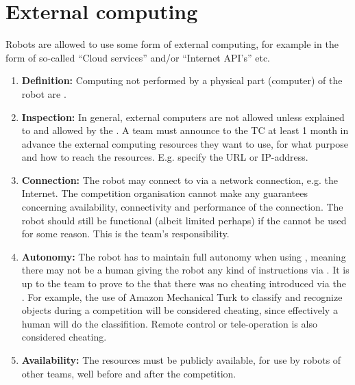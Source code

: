 \section{External computing}\label{rule:robot_external_computing}
Robots are allowed to use some form of external computing, for example in the form of so-called ``Cloud services'' and/or ``Internet API's'' etc. 
\begin{enumerate}
	\item \textbf{Definition:} Computing not performed by a physical part (computer) of the robot are . 
	\item \textbf{Inspection:} In general, external computers are not allowed unless explained to and allowed by the .
	  A team must announce to the TC at least 1 month in advance the external computing resources they want to use, for what purpose and how to reach the resources.
	  E.g. specify the URL or IP-address. 
	\item \textbf{Connection:} The robot may connect to  via a network connection, e.g. the Internet. 
	  The competition organisation cannot make any guarantees concerning availability, connectivity and performance of the connection. 
	  The robot should still be functional (albeit limited perhaps) if the  cannot be used for some reason.
	  This is the team's responsibility. 
	\item \textbf{Autonomy:} The robot has to maintain full autonomy when using , 
	  meaning there may not be a human giving the robot any kind of instructions via .
	  It is up to the team to prove to the  that there was no cheating introduced via the . 
	  For example, the use of Amazon Mechanical Turk to classify and recognize objects during a competition will be considered cheating, since effectively a human will do the classifition. 
	  Remote control or tele-operation is also considered cheating. 
	\item \textbf{Availability:} The resources must be publicly available, for use by robots of other teams, well before and after the competition.
\end{enumerate}


 
